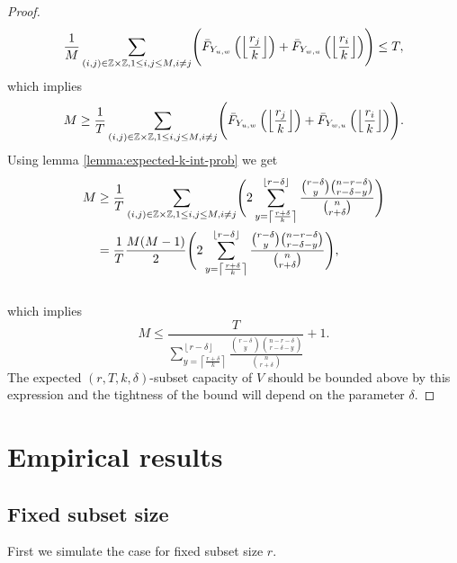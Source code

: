 \begin{proof}
\begin{equation*}
      \frac{1}{M} \sum_{(i,j) \in \mathbb{Z}\times\mathbb{Z}, 1 \le i,j \le M, i \ne j}  \Biggl( \bar{F}_{Y_{u,w}}\left(\left\lfloor \frac{r_j}{k} \right\rfloor\right) + \bar{F}_{Y_{w,u}}\left(\left\lfloor \frac{r_i}{k} \right\rfloor\right) \Biggr)  \le T,
\end{equation*}
\noindent which implies
\begin{equation}
\label{equ:cap-r}      
       M \geq \frac{1}{T}\sum_{(i,j) \in \mathbb{Z}\times\mathbb{Z}, 1 \le i,j \le M, i \ne j}  \Biggl( \bar{F}_{Y_{u,w}}\left(\left\lfloor \frac{r_j}{k} \right\rfloor\right) + \bar{F}_{Y_{w,u}}\left(\left\lfloor \frac{r_i}{k} \right\rfloor\right)\Biggr). 
\end{equation}
Using lemma \ref{lemma:expected-k-int-prob} we get
\begin{equation}
\label{equ:cap-r-2}
    \begin{split}
           M &\ge
           \frac{1}{T}\sum_{(i,j) \in \mathbb{Z}\times\mathbb{Z}, 1 \le i,j \le M, i \ne j}  \Biggl( 2 \sum_{y = \left\lceil \frac{r+\delta}{k} \right\rceil}^{\left\lfloor r - \delta \right\rfloor} \frac{\binom{r-\delta}{y} \binom{n-r-\delta}{r-\delta-y}}{\binom{n}{r+\delta}}\Biggr) \\
           &=\frac{1}{T} \frac{M(M-1)}{2} \Biggl( 2 \sum_{y = \left\lceil \frac{r+\delta}{k} \right\rceil}^{\left\lfloor r - \delta \right\rfloor} \frac{\binom{r-\delta}{y} \binom{n-r-\delta}{r-\delta-y}}{\binom{n}{r+\delta}}\Biggr),
    \end{split}
    \end{equation} \\
\noindent which implies 
\begin{equation}
    \label{equ:cap-r-bounded}     
    M \le \frac{T}{\sum_{y = \left\lceil \frac{r+\delta}{k} \right\rceil}^{\left\lfloor r - \delta \right\rfloor} \frac{\binom{r-\delta}{y} \binom{n-r-\delta}{r-\delta-y}}{\binom{n}{r+\delta}}} + 1.
\end{equation}
The expected $(r,T,k,\delta)$-subset capacity of $V$ should be bounded above by this expression and the tightness of the bound will depend on the parameter $\delta$. 
\end{proof}

\section{Empirical results}

\subsection{Fixed subset size}
First we simulate the case for fixed subset size $r$. 

